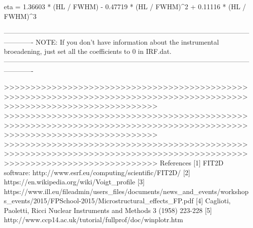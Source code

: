 eta = 1.36603 * (HL / FWHM) - 0.47719 * (HL / FWHM)^2 + 0.11116 * (HL / FWHM)^3

-------------------------------------------------------------------------------------------------------------------------
NOTE: If you don't have information about the instrumental broeadening, just set all the coefficients to 0 in IRF.dat.
-------------------------------------------------------------------------------------------------------------------------
 
>>>>>>>>>>>>>>>>>>>>>>>>>>>>>>>>>>>>>>>>>>>>>>>>>>>>>>>>>>>>>>>>>>>>>>>>>>>>>>>>>>>>>>>>>>>>>>>>>>>>>>>>>>>>>>>>>>>>>>>>>
>>>>>>>>>>>>>>>>>>>>>>>>>>>>>>>>>>>>>>>>>>>>>>>>>>>>>>>>>>>>>>>>>>>>>>>>>>>>>>>>>>>>>>>>>>>>>>>>>>>>>>>>>>>>>>>>>>>>>>>>>
>>>>>>>>>>>>>>>>>>>>>>>>>>>>>>>>>>>>>>>>>>>>>>>>>>>>>>>>>>>>>>>>>>>>>>>>>>>>>>>>>>>>>>>>>>>>>>>>>>>>>>>>>>>>>>>>>>>>>>>>>
References
[1] FIT2D software: http://www.esrf.eu/computing/scientific/FIT2D/
[2] https://en.wikipedia.org/wiki/Voigt_profile
[3] https://www.ill.eu/fileadmin/users_files/documents/news_and_events/workshops_events/2015/FPSchool-2015/Microstructural_effects_FP.pdf
[4] Caglioti, Paoletti, Ricci Nuclear Instruments and Methods 3 (1958) 223-228
[5] http://www.ccp14.ac.uk/tutorial/fullprof/doc/winplotr.htm
